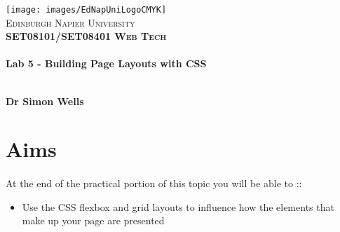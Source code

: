 \documentclass[10pt, a4paper, twosize]{article}
\begin{document}

\begin{titlepage}
\vspace*{5cm}
\begin{center}
\texttt{[image: images/EdNapUniLogoCMYK]}~\\[1cm]

\textsc{\Large Edinburgh Napier University}\\[1.5cm]

\textsc{\LARGE \bfseries SET08101/SET08401 Web Tech}\\[0.5cm]

\hrulefill \\[0.4cm]
{\huge \bfseries Lab 5 - Building Page Layouts with CSS\\[0.4cm] }
\hrulefill \\[1.5cm]

\begin{minipage}{0.4\textwidth}
\begin{flushleft} \large
\textbf{Dr Simon Wells} \\
\end{flushleft}
\end{minipage}

\vfill

\end{center}
\end{titlepage}




%

\section*{Aims}
\paragraph{} At the end of the practical portion of this topic you will be able to ::

\begin{itemize}
    \item Use the CSS flexbox and grid layouts to influence how the elements that make up your page are presented
\end{itemize}
\end{document}
